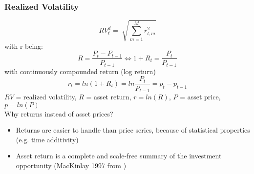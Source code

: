 \documentclass[aspectratio=169]{beamer}
\begin{document}
\begin{frame}
\frametitle{Realized Volatility}
\begin{footnotesize}
	\begin{equation}
	RV^{d}_{t} = \sqrt[]{\sum_{m=1}^{M} r^{2}_{t,m}}
	\end{equation}
with r being: 
	\begin{equation}
	R = \frac{P_{t} - P_{t-1}}{P_{t-1}} 
	\Leftrightarrow 1 + R_{t} = \frac{P_{t}}{P_{t-1}}
	\end{equation}
	with continuously compounded return (log return)
	\begin{equation}
	r_{t} = ln(1 + R_{t}) = ln\frac{P_{t}}{P_{t-1}} = p_{t} - p_{t-1}
	\end{equation}
	$RV$ = realized volatility, $R$ = asset return, $r = ln(R)$, $P$ = asset price, $p=ln(P)$\\
Why returns instead of asset prices?\\
	\begin{itemize}
	\item Returns are easier to handle than price series, because of statistical properties (e.g. time additivity)
	\item Asset return is a complete and scale-free summary of the investment opportunity (MacKinlay 1997 from \textcite{tsay2005})
	\end{itemize}
\end{footnotesize}
\end{frame}
\end{document}
